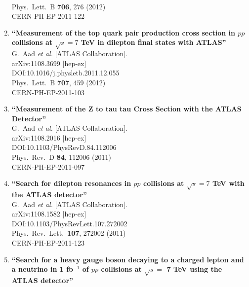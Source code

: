 \documentclass{article}
\begin{document}
\begin{enumerate}
  \\{}Phys.\ Lett.\ B {\bf 706}, 276 (2012)
  \\{}CERN-PH-EP-2011-122
\item%
{\bf ``Measurement of the top quark pair production cross section in $pp$ collisions at $\sqrt{s}=7$ TeV in dilepton final states with ATLAS''}
  \\{}G.~Aad {\it et al.} [ATLAS Collaboration].
  \\{}arXiv:1108.3699 [hep-ex]
  \\{}DOI:10.1016/j.physletb.2011.12.055
  \\{}Phys.\ Lett.\ B {\bf 707}, 459 (2012)
  \\{}CERN-PH-EP-2011-103
\item%
{\bf ``Measurement of the Z to tau tau Cross Section with the ATLAS Detector''}
  \\{}G.~Aad {\it et al.} [ATLAS Collaboration].
  \\{}arXiv:1108.2016 [hep-ex]
  \\{}DOI:10.1103/PhysRevD.84.112006
  \\{}Phys.\ Rev.\ D {\bf 84}, 112006 (2011)
  \\{}CERN-PH-EP-2011-097
\item%
{\bf ``Search for dilepton resonances in $pp$ collisions at $\sqrt{s}=7$ TeV with the ATLAS detector''}
  \\{}G.~Aad {\it et al.} [ATLAS Collaboration].
  \\{}arXiv:1108.1582 [hep-ex]
  \\{}DOI:10.1103/PhysRevLett.107.272002
  \\{}Phys.\ Rev.\ Lett.\  {\bf 107}, 272002 (2011)
  \\{}CERN-PH-EP-2011-123
\item%
{\bf ``Search for a heavy gauge boson decaying to a charged lepton and a neutrino in 1 fb$^{-1}$ of $pp$ collisions at $\sqrt{s}=$ 7 TeV using the ATLAS detector''}

\end{enumerate}
\end{document}
